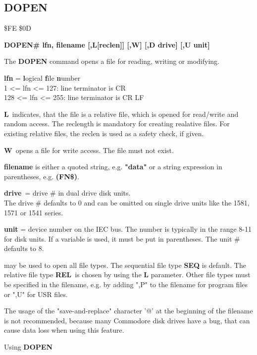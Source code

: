 \subsection{DOPEN}
\begin{description}[leftmargin=3cm,style=nextline]
\item [Token:] \$FE \$0D
\item [Format:]
  {\bf DOPEN\# lfn, filename [,L[reclen]] [,W] [,D drive] [,U unit] }
\item [Usage:]
   The {\bf DOPEN} command opens a file for reading, writing or
   modifying.

   {\bf lfn} = {\bf l}ogical {\bf f}ile {\bf n}umber \\
   1 <= lfn <= 127: line terminator is CR \\
   128 <= lfn <= 255: line terminator is CR LF

   {\bf L} indicates, that the file is a relative file, which
   is opened for read/write and random access. The reclength
   is mandatory for creating realative files. For existing
   relative files, the reclen is used as a safety check, if given.

   {\bf W} opens a file for write access. The file must not exist.

   {\bf filename} is either a quoted string, e.g. {\bf "data"} or
   a string expression in parentheses, e.g. {\bf (FN\$)}.

   {\bf drive} = drive \# in dual drive disk units. \\
   The drive \# defaults to 0 and can be omitted on single drive units
   like the 1581, 1571 or 1541 series.

   {\bf unit} = device number on the IEC bus.
   The number is typically in the range 8-11 for disk units.
   If a variable is used, it must be put in parentheses.
   The unit \# defaults to 8.

\item [Remarks:]
    may be used to open all file types.
   The sequential file type {\bf SEQ} is default.
   The relative file type {\bf REL} is chosen by using the
   {\bf L} parameter.  Other file types
   must be specified in the filename, e.g. by adding ",P" to the
   filename for program files or ",U" for USR files.

   The usage of the "save-and-replace" character '@' at the
   beginning of the filename is not recommended, because many
   Commodore disk drives have a bug, that can cause data loss
   when using this feature.

\item [Example:] Using {\bf DOPEN}

\end{description}

